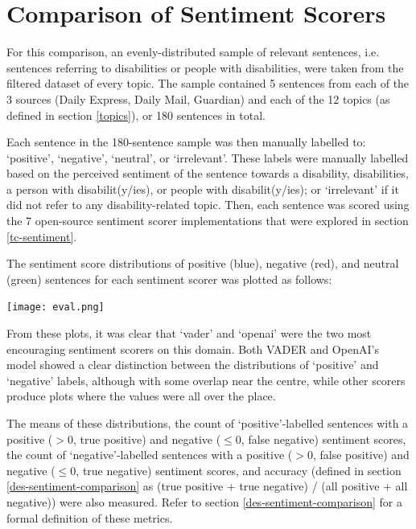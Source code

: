 \documentclass{report}
\begin{document}
\section{Comparison of Sentiment Scorers} \label{Comparison of sentiment scorers}
For this comparison, an evenly-distributed sample of relevant sentences, i.e. sentences referring to disabilities or people with disabilities, were taken from the filtered dataset of every topic. 
The sample contained 5 sentences from each of the 3 sources (Daily Express, Daily Mail, Guardian) and each of the 12 topics (as defined in section \ref{topics}), or 180 sentences in total. %

Each sentence in the 180-sentence sample was then manually labelled to: `positive', `negative', `neutral', or `irrelevant'.
These labels were manually labelled based on the perceived sentiment of the sentence towards a disability, disabilities, a person with disabilit(y/ies), or people with disabilit(y/ies); or `irrelevant' if it did not refer to any disability-related topic.
Then, each sentence was scored using the 7 open-source sentiment scorer implementations that were explored in section \ref{tc-sentiment}.

The sentiment score distributions of positive (blue), negative (red), and neutral (green) sentences for each sentiment scorer was plotted as follows:

\noindent
\texttt{[image: eval.png]}

From these plots, it was clear that `vader' \cite{VADER} and `openai' \cite{OpenAI} were the two most encouraging sentiment scorers on this domain.
Both VADER and OpenAI's model showed a clear distinction between the distributions of `positive' and `negative' labels, although with some overlap near the centre, while other scorers produce plots where the values were all over the place.

The means of these distributions, the count of `positive'-labelled sentences with a positive ($>$0, true positive) and negative ($\le$0, false negative) sentiment scores, the count of `negative'-labelled sentences with a positive ($>$0, false positive) and negative ($\le$0, true negative) sentiment scores, and accuracy (defined in section \ref{des-sentiment-comparison} as (true positive + true negative) / (all positive + all negative)) were also measured.
Refer to section \ref{des-sentiment-comparison} for a formal definition of these metrics.
\end{document}

